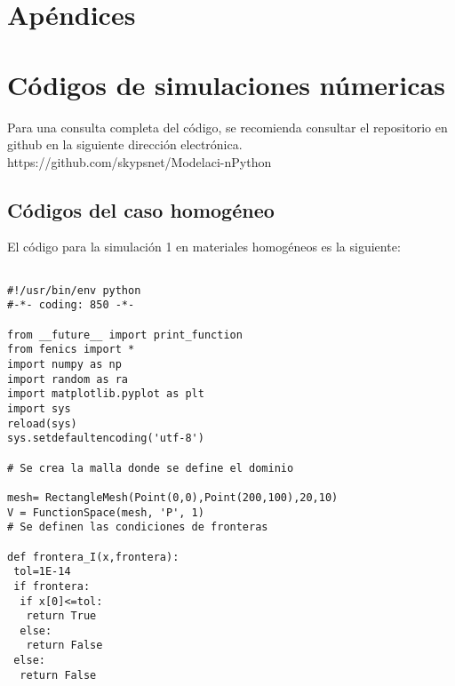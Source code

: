 \chapter*{Apéndices}
\appendix
\chapter{Códigos de simulaciones númericas}
Para una consulta completa del código, se recomienda consultar el repositorio en github en la siguiente dirección electrónica.
https://github.com/skypsnet/Modelaci-nPython

\section{Códigos del caso homogéneo}
El código para la simulación 1 en materiales homogéneos es la siguiente:


\begin{lstlisting}[frame=single]

#!/usr/bin/env python
#-*- coding: 850 -*-

from __future__ import print_function
from fenics import *
import numpy as np
import random as ra
import matplotlib.pyplot as plt
import sys
reload(sys)
sys.setdefaultencoding('utf-8')

# Se crea la malla donde se define el dominio

mesh= RectangleMesh(Point(0,0),Point(200,100),20,10)
V = FunctionSpace(mesh, 'P', 1)
# Se definen las condiciones de fronteras

def frontera_I(x,frontera):
 tol=1E-14    
 if frontera:
  if x[0]<=tol: 
   return True
  else:
   return False 
 else:
  return False  

\end{lstlisting}

\newpage

